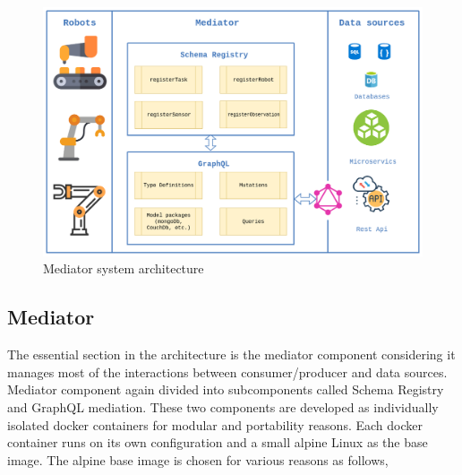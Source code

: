 	\begin{figure}[!htbp] 
		\begin{center}
			\includegraphics[scale=0.4]{./images/png/implementation/Architecture}	
			\caption{Mediator system architecture}	
			\label{fig:architecture}	
		\end{center}
	\end{figure}
	
	
	\subsection{Mediator} 
	The essential section in the architecture is the mediator component considering it manages most of the interactions between consumer/producer and data sources. Mediator component again divided into subcomponents called Schema Registry and GraphQL mediation.  These two components are developed as individually isolated docker containers for modular and portability reasons. Each docker container runs on its own configuration and a small alpine Linux as the base image. The alpine base image is chosen for various reasons as follows, 
	

